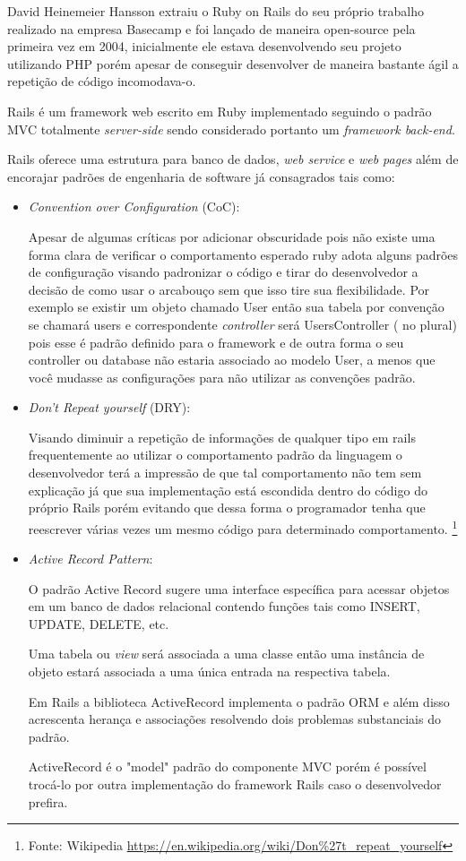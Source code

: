 \par David Heinemeier Hansson extraiu o Ruby on Rails do seu próprio trabalho realizado na empresa Basecamp e foi lançado de maneira open-source pela primeira vez em 2004, inicialmente ele estava desenvolvendo seu projeto utilizando PHP porém apesar de conseguir desenvolver de maneira bastante ágil a repetição de código incomodava-o.
\par Rails é um framework web escrito em Ruby implementado seguindo o padrão MVC totalmente \emph{server-side} sendo considerado portanto um \emph{framework back-end}.
\par Rails oferece uma estrutura para banco de dados, \emph{web service} e \emph{web pages} além de encorajar padrões de engenharia de software já consagrados tais como:
\begin{itemize}
\item {\emph{Convention over Configuration} (CoC):}
    \par Apesar de algumas críticas por adicionar obscuridade pois não existe uma forma clara de verificar o comportamento esperado ruby adota alguns padrões de configuração visando padronizar o código e tirar do desenvolvedor a decisão de como usar o arcabouço sem que isso tire sua flexibilidade. Por exemplo se existir um objeto chamado User então sua tabela por convenção se chamará users e correspondente \emph{controller} será UsersController ( no plural) pois esse é padrão definido para o framework e de outra forma o seu controller ou database não estaria associado ao modelo User, a menos que você mudasse as configurações para não utilizar as convenções padrão.

\item {\emph{Don't Repeat yourself} (DRY):}

    \par Visando diminuir a repetição de informações de qualquer tipo em rails frequentemente ao utilizar o comportamento padrão da linguagem o desenvolvedor terá a impressão de que tal comportamento não tem sem explicação já que sua implementação está escondida dentro do código do próprio Rails porém evitando que dessa forma o programador tenha que reescrever várias vezes um mesmo código para determinado comportamento. \footnote{Fonte: Wikipedia \url{https://en.wikipedia.org/wiki/Don\%27t_repeat_yourself}}

\item { \emph{Active Record Pattern}:}
    \par O padrão Active Record sugere uma interface específica para acessar objetos em um banco de dados relacional contendo funções tais como INSERT, UPDATE, DELETE, etc.
    \par Uma tabela ou \emph{view} será associada a uma classe então uma instância de objeto estará associada a uma única entrada na respectiva tabela.
    \par Em Rails a biblioteca ActiveRecord implementa o padrão ORM e além disso acrescenta herança e associações resolvendo dois problemas substanciais do padrão.
    \par ActiveRecord é o "model" padrão do componente MVC porém é possível trocá-lo por outra implementação do framework Rails caso o desenvolvedor prefira.
\end{itemize}
